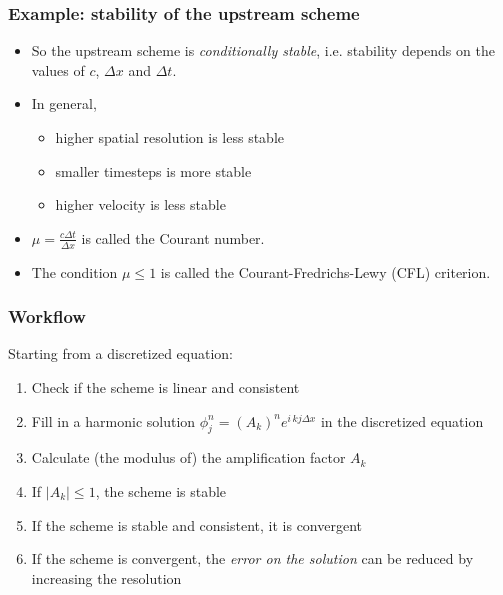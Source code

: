 \documentclass[aspectratio=149,9pt]{beamer}
\begin{document}
%
\begin{frame}
	\frametitle{Example: stability of the upstream scheme}
	\begin{itemize}
		\item So the upstream scheme is \emph{conditionally stable}, i.e. stability depends on the values of $c$, $\Delta x$ and $\Delta t$.\\[4ex]
		\item In general,
			\begin{itemize}
				\item higher spatial resolution is less stable
				\item smaller timesteps is more stable
				\item higher velocity is less stable\\[4ex]
			\end{itemize}
		\item $\mu=\frac{c \Delta t }{\Delta x}$ is called the Courant number.\\[4ex]
		\item The condition $\mu\leq 1$ is called the Courant-Fredrichs-Lewy (CFL) criterion.
	\end{itemize}
\end{frame}
%
%
\begin{frame}
	\frametitle{Workflow}
	Starting from a discretized equation:\vspace*{2ex}
	\begin{enumerate}
		\item Check if the scheme is linear and consistent\vspace*{1ex}
		\item Fill in a harmonic solution $\phi_j^n=(A_k)^n e^{i\,kj\Delta x}$ in the discretized equation\vspace*{1ex}
		\item Calculate (the modulus of) the amplification factor $A_k$\vspace*{1ex}
		\item If $|A_k| \leq 1$, the scheme is stable\vspace*{1ex}
		\item If the scheme is stable and consistent, it is convergent\vspace*{1ex}
		\item If the scheme is convergent, the \emph{error on the solution} can be reduced by increasing the resolution
	\end{enumerate}
\end{frame}
\end{document}

